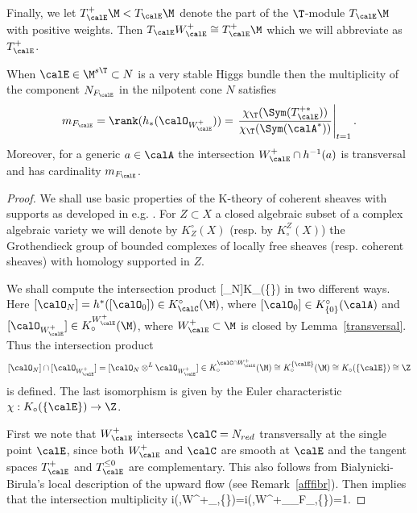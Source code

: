Finally, we let $T_\calE^+\M<T_\calE\M$ denote the part of the $\T$-module $T_\calE\M$ with positive weights. Then $T_\calE W^+_\calE\cong T_\calE^+\M$ which  we will abbreviate as $T_\calE^+$.
\begin{theorem}
\notready \label{multiplicity} When $\calE\in \M^{s \T}\subset N$ is a very stable Higgs bundle then the multiplicity of the component $N_{F_\calE}$   in the nilpotent cone $N$ satisfies $$m_{F_\calE}=\rank(h_*(\calO_{W^+_\calE}))=\left. { \chi_\T(\Sym(T^{+*}_\calE))\over \chi_\T(\Sym(\calA^*))}\right|_{t=1}.$$  Moreover, for a generic $a\in \calA$  the intersection $W^+_\calE\cap h^{-1}(a)$ is transversal and has cardinality $m_{F_\calE}$.
\end{theorem}
\begin{proof} We shall use basic properties of the
	K-theory of coherent sheaves with supports as developed in e.g. \cite{baum-etal,gillet-soule,piepmeyer-walker}. For $Z\subset X$ a closed algebraic  subset of a complex algebraic variety we will denote by $K^\circ_Z(X)$ (resp. by $K^Z_\circ(X)$)  the Grothendieck group of bounded complexes of locally free sheaves (resp. coherent sheaves) with homology supported in $Z$.

	We shall compute the intersection product \beq \label{rankmult} [\calO_{N}]\in  K_\circ(\{\calE\})\cong \Z\eeq
{}
	in two different ways. Here $[\calO_{N}]=h^*([\calO_0])\in K^\circ_\calC(\M)$, where  $[\calO_0]\in K^\circ_{\{0\}}(\calA)$
	and $[\calO_{W^+_\calE}]\in K^{W^+_\calE}_\circ(\M)$, where $W^+_\calE\subset \M$ is closed by Lemma~\ref{transversal}.  Thus the intersection product $$[\calO_{N}]\cap[\calO_{W^+_\calE}]=[\calO_N\otimes^L\calO_{W^+_\calE}] \in K_\circ^{\calC\cap W^+_{\calE}}(\M)\cong K^{\{\calE\}}_\circ (\M)\cong K_\circ(\{\calE\})\cong \Z$$ is defined. The last isomorphism is given by the Euler characteristic $\chi:K_\circ(\{ \calE \})\to \Z$.  %


	First we note that $W^+_\calE$ intersects $\calC=N_{red}$ transversally at the single point $\calE$, since both $W^+_\calE$ and $\calC$ are smooth at $\calE$ and the tangent spaces  $T^+_\calE$ and $T^{\leq  0}_\calE$ are complementary. This also follows from Bialynicki-Birula's local description of the upward flow (see Remark~\ref{afffibr}). Then \cite[\href{https://stacks.math.columbia.edu/tag/0B1I}{Lemma 42.14.3}]{stackproject} implies that the intersection multiplicity \beq\label{tranint}i(\M,W^+_\calE\cdot \calC,\{\calE\})=i(\M,W^+_\calE\cdot \calC_{F_\calE},\{\calE\})=1.\eeq
{}


\end{proof}

